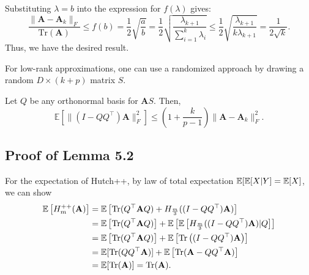 Substituting $\lambda = b$ into the expression for $f(\lambda)$ gives:
\[
\frac{\|\mathbf{A} - \mathbf{A}_k\|_F}{\mathrm{Tr}(\mathbf{A})} \le f(b) = \frac{1}{2} \sqrt{\frac{a}{b}} = \frac{1}{2} \sqrt{\frac{\lambda_{k+1}}{\sum_{i=1}^{k} \lambda_i}} \le \frac{1}{2} \sqrt{\frac{\lambda_{k+1}}{k \lambda_{k+1}}} = \frac{1}{2\sqrt{k}}.
\]
Thus, we have the desired result.


For low-rank approximations, one can use a randomized approach by drawing a random $D \times (k + p)$ matrix $S$.

\begin{theorem}
Let $Q$ be any orthonormal basis for $\mathbf{A} S$. Then,
\begin{equation}
    \mathbb{E}\left[ \|(I-QQ^\top) \mathbf{A}\|_F^2 \right] \le \left( 1 + \frac{k}{p-1} \right) \|\mathbf{A} - \mathbf{A}_{k}\|_F^2.
\end{equation}
\end{theorem}


\subsection{Proof of Lemma 5.2}
For the expectation of Hutch++, by law of total expectation $\mathbb{E}[\mathbb{E}[X|Y]=\mathbb{E}[X]$, we can show
\begin{align}
    \mathbb{E}\left[ H_m^{++}({\bf A}) \right]&=\mathbb{E}\left[ \mathrm{Tr}(Q^\top {\bf A} Q)+H_{\frac{m}{3}}( (I-QQ^\top){\bf A}) \right]\\
    &=\mathbb{E}\left[ \mathrm{Tr}(Q^\top {\bf A} Q) \right]+\mathbb{E}\left[ \mathbb{E}\left[ H_{\frac{m}{3}}( (I-QQ^\top){\bf A})|Q \right] \right]\\
    &=\mathbb{E}\left[ \mathrm{Tr}(Q^\top {\bf A} Q) \right]+\mathbb{E}\left[ \mathrm{Tr}\left( (I-QQ^\top){\bf A} \right) \right]\\
    &=\mathbb{E}[\mathrm{Tr}(QQ^\top{\bf A})]+\mathbb{E}\left[ \mathrm{Tr}({\bf A}-QQ^\top{\bf A}) \right]\\
    &=\mathbb{E}[\mathrm{Tr}({\bf A})]=\mathrm{Tr}({\bf A}). 
\end{align}

